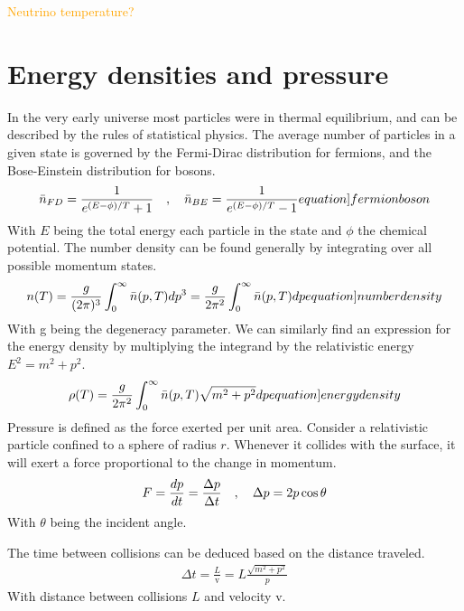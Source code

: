 \textcolor{orange}{Neutrino temperature?}


\section{Energy densities and pressure}

In the very early universe most particles were in thermal equilibrium, and can be described by the rules of statistical physics. The average number of particles in a given state is governed by the Fermi-Dirac distribution for fermions, and the Bose-Einstein distribution for bosons.
\begin{align}
    \bar{n}_{FD}=\frac{1}{e^{(E-\phi)/T}+1} \eqsep   \bar{n}_{BE}=\frac{1}{e^{(E-\phi)/T}-1}
    \label[equation]{fermionboson}
\end{align}
With $E$ being the total energy each particle in the state and $\phi$ the chemical potential. The number density can be found generally by integrating over all possible momentum states. 
\begin{align}
    n(T)=\frac{g}{(2\pi)^3}\int_{0}^{\infty}\bar{n}(p,T)dp^3=\frac{g}{2\pi^2}\int_{0}^{\infty}\bar{n}(p,T)dp
    \label[equation]{numberdensity}
\end{align}
With g being the degeneracy parameter. We can similarly find an expression for the energy density by multiplying the integrand by the relativistic energy $E^2=m^2+p^2$.
\begin{align}
    \rho(T)=\frac{g}{2\pi^2}\int_{0}^{\infty}\bar{n}(p,T)\sqrt{m^2+p^2}dp
    \label[equation]{energydensity}
\end{align}
Pressure is defined as the force exerted per unit area. Consider a relativistic particle confined to a sphere of radius $r$. Whenever it collides with the surface, it will exert a force proportional to the change in momentum. 
\begin{align}
    F=\frac{dp}{dt}=\frac{\Delta p }{\Delta t}\quad , \quad
    \Delta p = 2p \cos \theta
\end{align}
With $\theta$ being the incident angle. 

The time between collisions can be deduced based on the distance traveled. 
\begin{align}
    \Delta t = \frac{L}{\mathrm{v}}=L\frac{\sqrt{m^2+p^2}}{p}
\end{align}
With distance between collisions $L$ and velocity $\mathrm{v}$.

